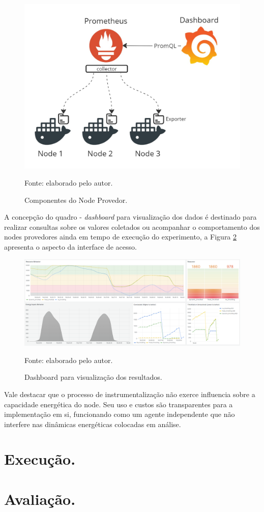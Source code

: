 \begin{figure}[H]
	\centering
	
	\caption{Componentes do Node Provedor.}
	\label{fig:cap6instrumentalizacao}
	\noindent\includegraphics[width=0.75\linewidth]{Imagens/cap6/cap6instrumentalizacao.jpg} 
	
	Fonte: elaborado pelo autor.
\end{figure}

A concepção do quadro - \textit{dashboard} para visualização dos dados é destinado para realizar consultas sobre os valores coletados ou acompanhar o comportamento dos nodes provedores ainda em tempo de execução do experimento, a Figura \ref{fig:cap6bashboard} apresenta o aspecto da interface de acesso.

\begin{figure}[H]
	\centering
	
	\caption{Dashboard para visualização dos resultados.}
	\label{fig:cap6bashboard}
	\noindent\includegraphics[width=1\linewidth]{Imagens/cap6/cap6dashboard.png} 
	
	Fonte: elaborado pelo autor.
\end{figure}

Vale destacar que o processo de instrumentalização não exerce influencia sobre a capacidade energética do node. Seu uso e custos são transparentes para a implementação em si, funcionando como um agente independente que não interfere nas dinâmicas energéticas colocadas em análise.


\section{Execução.}
\label{cap6:execucao}
\section{Avaliação.}
\label{cap6:avaliacao}
 